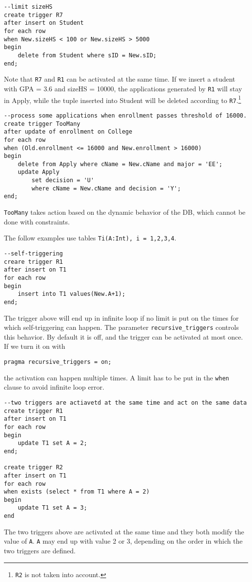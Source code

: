 \begin{lstlisting}
--limit sizeHS
create trigger R7
after insert on Student
for each row
when New.sizeHS < 100 or New.sizeHS > 5000
begin
	delete from Student where sID = New.sID;
end;
\end{lstlisting}
Note that \texttt{R7} and \texttt{R1} can be activated at the same time. If we insert a student with GPA = 3.6 and sizeHS = 10000, the applications generated by \texttt{R1} will stay in Apply, while the tuple inserted into Student will be deleted according to \texttt{R7}.\footnote{\texttt{R2} is not taken into account. }
\begin{lstlisting}
--process some applications when enrollment passes threshold of 16000.
create trigger TooMany
after update of enrollment on College
for each row
when (Old.enrollment <= 16000 and New.enrollment > 16000)
begin
	delete from Apply where cName = New.cName and major = 'EE';
	update Apply
		set decision = 'U'
		where cName = New.cName and decision = 'Y';
end;
\end{lstlisting}
\texttt{TooMany} takes action based on the dynamic behavior of the DB, which cannot be done with constraints.

The follow examples use tables \texttt{Ti(A:Int), i = 1,2,3,4}.
\begin{lstlisting}
--self-triggering
creare trigger R1
after insert on T1
for each row
begin
	insert into T1 values(New.A+1);
end;
\end{lstlisting}
The trigger above will end up in infinite loop if no limit is put on the times for which self-triggering can happen. The parameter \texttt{recursive\_triggers} controls this behavior. By default it is off, and the trigger can be activated at most once. If we turn it on with
\begin{lstlisting}
pragma recursive_triggers = on;
\end{lstlisting}
the activation can happen multiple times. A limit has to be put in the \texttt{when} clause to avoid infinite loop error. 
\begin{lstlisting}
--two triggers are actiavetd at the same time and act on the same data
create trigger R1
after insert on T1
for each row
begin
	update T1 set A = 2;
end;

create trigger R2
after insert on T1
for each row
when exists (select * from T1 where A = 2)
begin
	update T1 set A = 3;
end
\end{lstlisting}
The two triggers above are activated at the same time and they both modify the value of \texttt{A}. \texttt{A} may end up with value 2 or 3, depending on the order in which the two triggers are defined.
\ifx\PREAMBLE\undefined

\fi